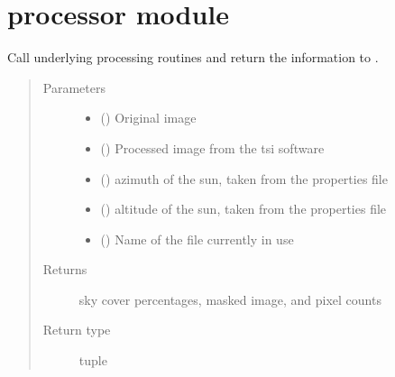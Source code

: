 \documentclass[letterpaper,10pt,english]{sphinxmanual}
\begin{document}
\section{processor module}
\label{\detokenize{processor:module-processor}}\label{\detokenize{processor::doc}}\label{\detokenize{processor:processor-module}}

\begin{fulllineitems}
\label{\detokenize{processor:processor.processor}}
Call underlying processing routines and return the information to {\hyperref[\detokenize{main:module-main}]{}}.
\begin{quote}\begin{description}
\item[{Parameters}] \leavevmode\begin{itemize}
\item {} 
 () \textendash{} Original image

\item {} 
 () \textendash{} Processed image from the tsi software

\item {} 
 () \textendash{} azimuth of the sun, taken from the properties file

\item {} 
 () \textendash{} altitude of the sun, taken from the properties file

\item {} 
 () \textendash{} Name of the file currently in use

\end{itemize}

\item[{Returns}] \leavevmode
sky cover percentages, masked image, and pixel counts

\item[{Return type}] \leavevmode
tuple

\end{description}\end{quote}

\end{fulllineitems}
\end{document}
